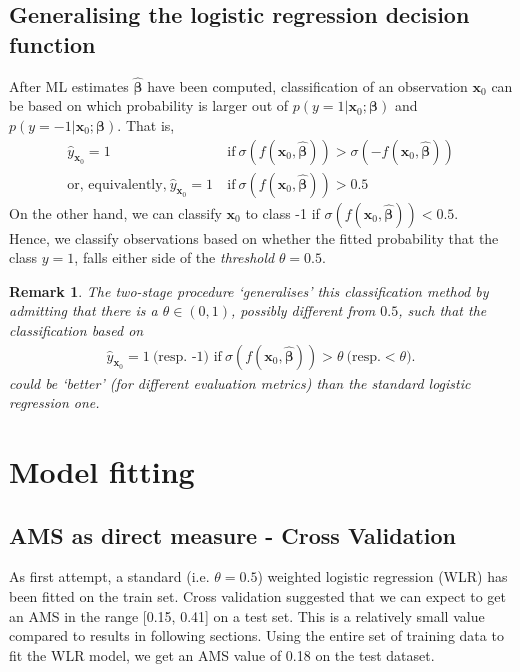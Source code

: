 \documentclass[]{article}
\newcommand{\x}{\mathbf{x}}
\newcommand{\bbeta}{\boldsymbol \beta}
\newtheorem{remark}[theorem]{Remark}
\begin{document}
\subsection{Generalising the logistic regression decision function}
\label{app:decision function}

After ML estimates $\hat{\bbeta}$ have been computed, classification of an observation $\x_0$ can be based on which probability is larger out of $p(y=1|\x_0;\bbeta)$ and $p(y=-1|\x_0;\bbeta)$. That is,
\begin{align*}
\hat{y}_{\x_0}=1 \ &\text{if} \ \sigma(f(\x_0,\hat{\bbeta}))>\sigma(-f(\x_0,\hat{\bbeta})) \\
\text{or, equivalently,} \
\hat{y}_{\x_0}=1  \ &\text{if} \ \sigma(f(\x_0,\hat{\bbeta}))> 0.5
\end{align*} 
On the other hand, we can classify $\x_0$ to class -1 if $\sigma(f(\x_0,\hat{\bbeta}))< 0.5$. \\

\noindent Hence, we classify observations based on whether the fitted probability that the class $y=1$, falls either side of the \textit{threshold} $\theta = 0.5$.

\begin{remark}
The two-stage procedure `generalises' this classification method by admitting that there is a $\theta\in (0,1)$, possibly different from $0.5$, such that the classification based on 
\begin{align*}
\hat{y}_{\x_0}=1 \ \text{(resp. -1) if}\ \sigma(f(\x_0,\hat{\bbeta}))> \theta \  \text{(resp.} <\theta).
\end{align*}
could be `better' (for different evaluation metrics) than the standard logistic regression one. 
\end{remark}


\section{Model fitting}

\subsection{AMS as direct measure - Cross Validation}

As first attempt, a standard (i.e. $\theta=0.5$) weighted logistic regression (WLR) has been fitted on the train set. Cross validation suggested that we can expect to get an AMS in the range [0.15, 0.41] on a test set. This is a relatively small value compared to results in following sections. Using the entire set of training data to fit the WLR model, we get an AMS value of 0.18 on the test dataset.
\end{document}
